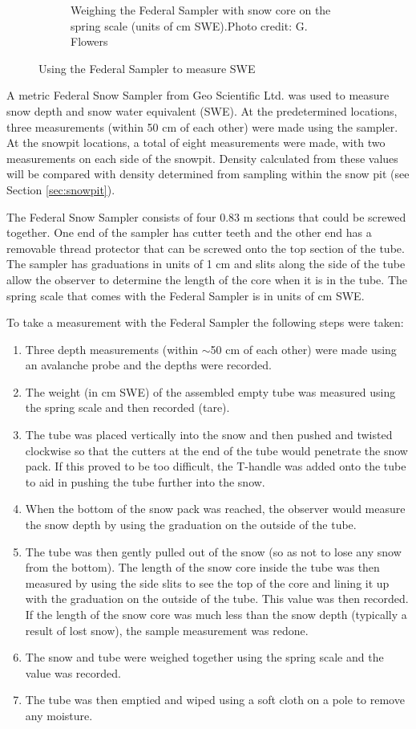 \documentclass[12pt]{article}
\begin{document}
\begin{figure}
\begin{subfigure}[b]{0.56\textwidth}
        \caption{Weighing the Federal Sampler with snow core on the spring scale (units of cm SWE).Photo credit: G. Flowers}
        \label{photo_swe2}
    \end{subfigure}

    \caption{Using the Federal Sampler to measure SWE}
    \label{photo_swe}
\end{figure}
 
A metric Federal Snow Sampler from Geo Scientific Ltd. was used to measure snow depth and snow water equivalent (SWE). At the predetermined locations, three measurements (within 50 cm of each other) were made using the sampler. At the snowpit locations, a total of eight measurements were made, with two measurements on each side of the snowpit. Density calculated from these values will be compared with density determined from sampling within the snow pit (see Section \ref{sec:snowpit}). 

The Federal Snow Sampler consists of four 0.83 m sections that could be screwed together. One end of the sampler has cutter teeth and the other end has a removable thread protector that can be screwed onto the top section of the tube. The sampler has graduations in units of 1 cm and slits along the side of the tube allow the observer to determine the length of the core when it is in the tube. The spring scale that comes with the Federal Sampler is in units of cm SWE.  

To take a measurement with the Federal Sampler the following steps were taken:
\begin{enumerate}
\item Three depth measurements (within $\sim$50 cm of each other) were made using an avalanche probe and the depths were recorded.
\item The weight (in cm SWE) of the assembled empty tube was measured using the spring scale and then recorded (tare).
\item The tube was placed vertically into the snow and then pushed and twisted clockwise so that the cutters at the end of the tube would penetrate the snow pack. If this proved to be too difficult, the T-handle was added onto the tube to aid in pushing the tube further into the snow. 
\item When the bottom of the snow pack was reached, the observer would measure the snow depth by using the graduation on the outside of the tube.
\item The tube was then gently pulled out of the snow (so as not to lose any snow from the bottom). The length of the snow core inside the tube was then measured by using the side slits to see the top of the core and lining it up with the graduation on the outside of the tube. This value was then recorded. If the length of the snow core was much less than the snow depth (typically a result of lost snow), the sample measurement was redone.
\item The snow and tube were weighed together using the spring scale and the value was recorded.
\item The tube was then emptied and wiped using a soft cloth on a pole to remove any moisture. 
\end{enumerate}
\end{document}
